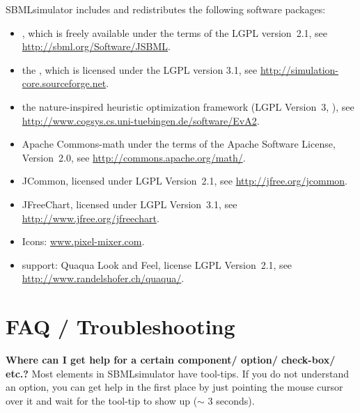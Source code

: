 SBMLsimulator includes and redistributes the following software packages:
\begin{itemize}
\item \JSBML \citep{Draeger2011}, which is freely available under the terms of the \ac{LGPL} version~2.1, see \href{http://sbml.org/Software/JSBML}{\url{http://sbml.org/Software/JSBML}}.
\item the \SBSCL \citep{Keller2013}, which is licensed under the \ac{LGPL} version 3.1, see \href{http://simulation-core.sourceforge.net}{\url{http://simulation-core.sourceforge.net}}.
\item the nature-inspired heuristic optimization framework \EvA (\ac{LGPL} Version~3, \citealp{Kron10EvA2}), see \href{http://www.cogsys.cs.uni-tuebingen.de/software/EvA2}{\url{http://www.cogsys.cs.uni-tuebingen.de/software/EvA2}}.
\item Apache Commons-math under the terms of the Apache Software License, Version~2.0, see \href{http://commons.apache.org/math/}{\url{http://commons.apache.org/math/}}.
\item JCommon, licensed under \ac{LGPL} Version~2.1, see \href{http://jfree.org/jcommon}{\url{http://jfree.org/jcommon}}.
\item JFreeChart, licensed under \ac{LGPL} Version~3.1, see \href{http://www.jfree.org/jfreechart}{\url{http://www.jfree.org/jfreechart}}.
\item Icons: \href{http://www.pixel-mixer.com}{\url{www.pixel-mixer.com}}.
\item \MacOSX support: Quaqua Look and Feel, license \ac{LGPL} Version~2.1, see \href{http://www.randelshofer.ch/quaqua/}{\url{http://www.randelshofer.ch/quaqua/}}.
\end{itemize}


\chapter{FAQ / Troubleshooting}
\label{ch:faq}


\noindent \textbf{Where can I get help for a certain component/ option/ check-box/ etc.?}\newline
Most elements in SBMLsimulator have tool-tips. If you do not understand an option, you
can get help in the first place by just pointing the mouse cursor over it and
wait for the tool-tip to show up ($\sim$ 3 seconds).\newline

